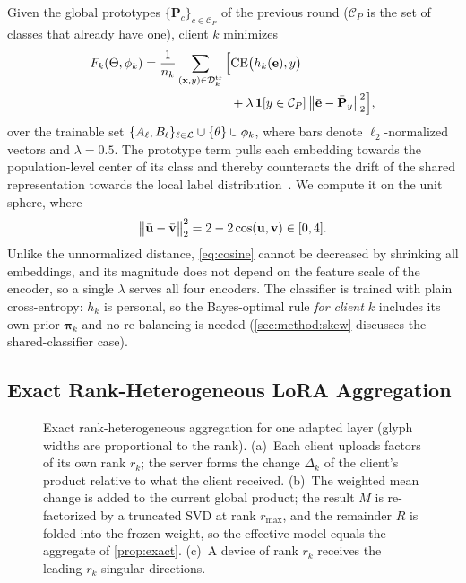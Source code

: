 Given the global prototypes $\{\mathbf{P}_c\}_{c\in\mathcal{C}_P}$ of the previous round
($\mathcal{C}_P$ is the set of classes that already have one), client $k$ minimizes
\begin{equation}\label{eq:local-obj}
\begin{aligned}
  F_k(\Theta,\phi_k)=\frac{1}{n_k}\sum_{(\mathbf{x},y)\in\mathcal{D}_k^{\mathrm{tr}}}\Big[&\mathrm{CE}\big(h_k(\mathbf{e}),y\big)\\
  &+\lambda\,\mathbf{1}[y\in\mathcal{C}_P]\,\big\lVert\bar{\mathbf{e}}-\bar{\mathbf{P}}_y\big\rVert_2^2\Big],
\end{aligned}
\end{equation}
over the trainable set $\{A_\ell,B_\ell\}_{\ell\in\mathcal{L}}\cup\{\theta\}\cup\phi_k$, where bars denote
$\ell_2$-normalized vectors and $\lambda=0.5$. The prototype term pulls each embedding towards the
population-level center of its class and thereby counteracts the drift of the shared
representation towards the local label distribution~\cite{tan2022fedproto}. We compute it on the unit
sphere, where
\begin{equation}\label{eq:cosine}
  \big\lVert\bar{\mathbf{u}}-\bar{\mathbf{v}}\big\rVert_2^2=2-2\cos(\mathbf{u},\mathbf{v})\in[0,4].
\end{equation}
Unlike the unnormalized distance, \cref{eq:cosine} cannot be decreased by shrinking all embeddings,
and its magnitude does not depend on the feature scale of the encoder, so a single $\lambda$
serves all four encoders. The classifier is trained with plain cross-entropy: $h_k$ is personal,
so the Bayes-optimal rule \emph{for client $k$} includes its own prior $\boldsymbol{\pi}_k$ and no
re-balancing is needed (\cref{sec:method:skew} discusses the shared-classifier case).

\subsection{Exact Rank-Heterogeneous LoRA Aggregation}\label{sec:method:agg}

\begin{figure}[!t]
  \centering
  \resizebox{\columnwidth}{!}{}
  \caption{Exact rank-heterogeneous aggregation for one adapted layer (glyph widths are
  proportional to the rank). (a)~Each client uploads factors of its own rank $r_k$; the server
  forms the change $\Delta_k$ of the client's product relative to what the client received.
  (b)~The weighted mean change is added to the current global product; the result $M$ is
  re-factorized by a truncated SVD at rank $r_{\max}$, and the remainder $R$ is folded into the frozen
  weight, so the effective model equals the aggregate of \cref{prop:exact}. (c)~A device of
  rank $r_k$ receives the leading $r_k$ singular directions.}
  \label{fig:aggregation}
\end{figure}


